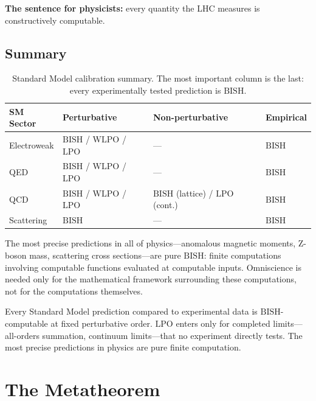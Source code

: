 \documentclass[11pt,a4paper]{report}
\theoremstyle{plain}
\theoremstyle{definition}
\theoremstyle{remark}
\newcommand{\BISH}{\mathrm{BISH}}
\newcommand{\WLPO}{\mathrm{WLPO}}
\newcommand{\LPO}{\mathrm{LPO}}
\begin{document}
\textbf{The sentence for physicists:} every quantity the LHC measures is constructively computable.

\section{Summary}

\begin{table}[h]
\centering
\begin{tabular}{@{}llll@{}}
\toprule
SM Sector & Perturbative & Non-perturbative & Empirical \\
\midrule
Electroweak & $\BISH$ / $\WLPO$ / $\LPO$ & --- & $\BISH$ \\
QED         & $\BISH$ / $\WLPO$ / $\LPO$ & --- & $\BISH$ \\
QCD         & $\BISH$ / $\WLPO$ / $\LPO$ & $\BISH$ (lattice) / $\LPO$ (cont.) & $\BISH$ \\
Scattering  & $\BISH$ & --- & $\BISH$ \\
\bottomrule
\end{tabular}
\caption{Standard Model calibration summary. The most important column is the last: every experimentally tested prediction is $\BISH$.}
\end{table}

The most precise predictions in all of physics---anomalous magnetic moments, Z-boson mass, scattering cross sections---are pure $\BISH$: finite computations involving computable functions evaluated at computable inputs. Omniscience is needed only for the mathematical framework surrounding these computations, not for the computations themselves.

\begin{chapterbox}
Every Standard Model prediction compared to experimental data is $\BISH$-computable at fixed perturbative order. $\LPO$ enters only for completed limits---all-orders summation, continuum limits---that no experiment directly tests. The most precise predictions in physics are pure finite computation.
\end{chapterbox}

\chapter{The Metatheorem}
\end{document}
